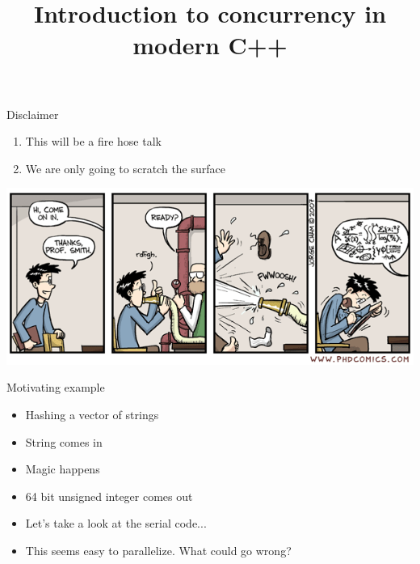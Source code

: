 \documentclass{beamer}
\title{Introduction to concurrency in modern C++}
\date{\vspace{5pt}\formatdate{13}{1}{2021}}
\begin{document}
\maketitle


\begin{frame}{Disclaimer}
\begin{enumerate}
\item This will be a fire hose talk
\item We are only going to scratch the surface
\end{enumerate}
\includegraphics[width=\linewidth]{firehose.png}
\end{frame}

\begin{frame}{Motivating example}
\begin{itemize}
\item Hashing a vector of strings
\item String comes in
\item Magic happens
\item 64 bit unsigned integer comes out
\item Let's take a look at the serial code...
\item This seems easy to parallelize. What could go wrong?
\end{itemize}
\end{frame}
\end{document}
